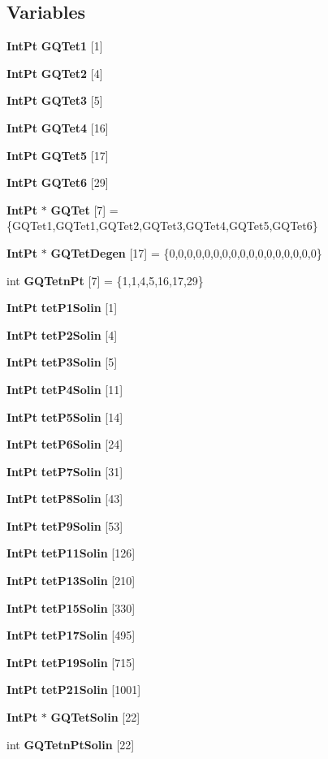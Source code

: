 \subsection*{Variables}
\begin{DoxyCompactItemize}
\item 
{\bf Int\-Pt} {\bfseries G\-Q\-Tet1} [1]
\item 
{\bf Int\-Pt} {\bfseries G\-Q\-Tet2} [4]
\item 
{\bf Int\-Pt} {\bfseries G\-Q\-Tet3} [5]
\item 
{\bf Int\-Pt} {\bfseries G\-Q\-Tet4} [16]
\item 
{\bf Int\-Pt} {\bfseries G\-Q\-Tet5} [17]
\item 
{\bf Int\-Pt} {\bfseries G\-Q\-Tet6} [29]\label{GaussQuadratureTet_8cc_ab5f60a0df40858739c66c61720ed8f9c}

\item 
{\bf Int\-Pt} $\ast$ {\bfseries G\-Q\-Tet} [7] = \{G\-Q\-Tet1,G\-Q\-Tet1,G\-Q\-Tet2,G\-Q\-Tet3,G\-Q\-Tet4,G\-Q\-Tet5,G\-Q\-Tet6\}\label{GaussQuadratureTet_8cc_a3e961388a13f12eb59d5f7bc9b3d4c33}

\item 
{\bf Int\-Pt} $\ast$ {\bfseries G\-Q\-Tet\-Degen} [17] = \{0,0,0,0,0,0,0,0,0,0,0,0,0,0,0,0,0\}\label{GaussQuadratureTet_8cc_a219ca1a955ef5ab39705d59da326c82b}

\item 
int {\bfseries G\-Q\-Tetn\-Pt} [7] = \{1,1,4,5,16,17,29\}\label{GaussQuadratureTet_8cc_a35821cd4b1687a431a2fd9a795842d9a}

\item 
{\bf Int\-Pt} {\bf tet\-P1\-Solin} [1]
\item 
{\bf Int\-Pt} {\bf tet\-P2\-Solin} [4]
\item 
{\bf Int\-Pt} {\bf tet\-P3\-Solin} [5]
\item 
{\bf Int\-Pt} {\bf tet\-P4\-Solin} [11]
\item 
{\bf Int\-Pt} {\bf tet\-P5\-Solin} [14]
\item 
{\bf Int\-Pt} {\bf tet\-P6\-Solin} [24]
\item 
{\bf Int\-Pt} {\bf tet\-P7\-Solin} [31]
\item 
{\bf Int\-Pt} {\bf tet\-P8\-Solin} [43]
\item 
{\bf Int\-Pt} {\bf tet\-P9\-Solin} [53]
\item 
{\bf Int\-Pt} {\bf tet\-P11\-Solin} [126]
\item 
{\bf Int\-Pt} {\bf tet\-P13\-Solin} [210]
\item 
{\bf Int\-Pt} {\bf tet\-P15\-Solin} [330]
\item 
{\bf Int\-Pt} {\bf tet\-P17\-Solin} [495]
\item 
{\bf Int\-Pt} {\bf tet\-P19\-Solin} [715]
\item 
{\bf Int\-Pt} {\bf tet\-P21\-Solin} [1001]
\item 
{\bf Int\-Pt} $\ast$ {\bfseries G\-Q\-Tet\-Solin} [22]
\item 
int {\bfseries G\-Q\-Tetn\-Pt\-Solin} [22]
\end{DoxyCompactItemize}


